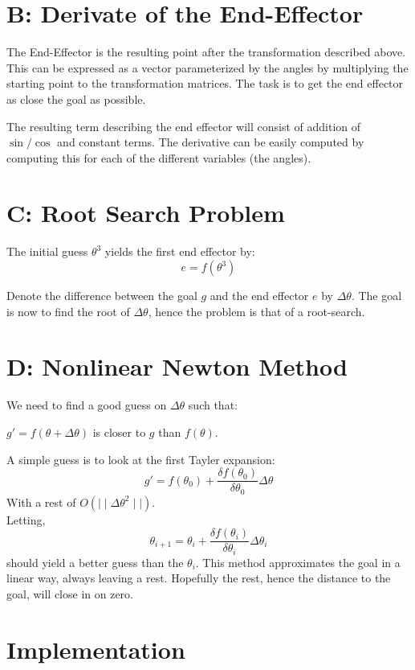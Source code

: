 \documentclass[10pt,oneside,a4paper,final,english]{memoir}
\begin{document}
\section*{B: Derivate of the End-Effector}
The End-Effector is the resulting point after the transformation
described above. This can be expressed as a vector parameterized by
the angles by multiplying the starting point to the transformation
matrices. The task is to get the end effector as close the goal as
possible.

The resulting term describing the end effector will consist of
addition of $\sin/\cos$ and constant terms. The derivative can be
easily computed by computing this for each of the different variables
(the angles).

\section*{C: Root Search Problem}
The initial guess $\theta^3$ yields the first end effector by:
\[ e = f(\theta^3) \]

Denote the difference between the goal $g$ and the end effector $e$ by
$\Delta\theta$. The goal is now to find the root of $\Delta\theta$,
hence the problem is that of a root-search.


\section*{D: Nonlinear Newton Method}
We need to find a good guess on $\Delta\theta$ such that:
\begin{center}
$g' = f(\theta + \Delta\theta)$ is closer to $g$ than $f(\theta)$.
\end{center}

A simple guess is to look at the first Tayler expansion:
\[ g' = f(\theta_0) + \frac{\delta
  f(\theta_0)}{\delta\theta_0}\Delta\theta \]
With a rest of $O(\mid\mid \Delta\theta^2\mid\mid)$. \\

Letting,
\[\theta_{i+1} = \theta_i +
\frac{\delta f(\theta_i)}{\delta\theta_i}\Delta\theta_i \]
should yield a better guess than the $\theta_i$. This method
approximates the goal in a linear way, always leaving a
rest. Hopefully the rest, hence the distance to the goal, will close
in on zero.



\section*{Implementation}
\end{document}
